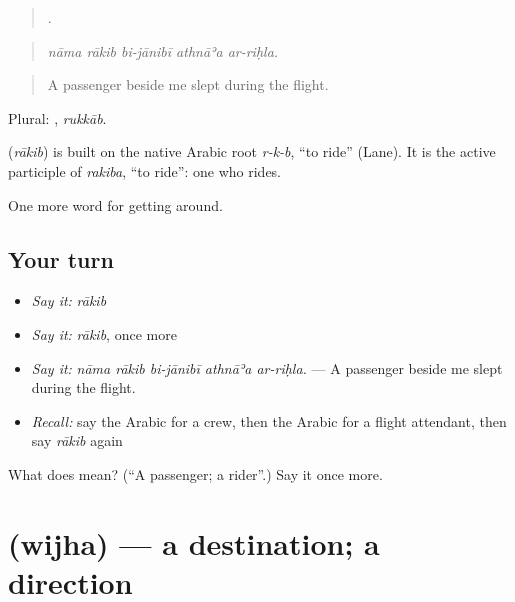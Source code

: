 \begin{quote}
    .
\end{quote}

\begin{quote}
\emph{nāma rākib bi-jānibī athnāʾa ar-riḥla.}
\end{quote}

\begin{quote}
A passenger beside me slept during the flight.
\end{quote}

Plural: , \emph{rukkāb}.

\begin{cousinweb}
\textbf{} (\emph{rākib}) is built on the native Arabic root \emph{r-k-b}, \textquotedblleft{}to ride\textquotedblright{} (Lane). It is the active participle of \emph{rakiba}, \textquotedblleft{}to ride\textquotedblright{}: one who rides.
\end{cousinweb}

\begin{grammarlens}[title={What you've built}]
One more word for getting around.
\end{grammarlens}

\subsection*{Your turn}
\begin{itemize}
\raggedright
  \item \emph{Say it:} \emph{rākib}
  \item \emph{Say it:} \emph{rākib}, once more
  \item \emph{Say it:} \emph{nāma rākib bi-jānibī athnāʾa ar-riḥla.} — A passenger beside me slept during the flight.
  \item \emph{Recall:} say the Arabic for a crew, then the Arabic for a flight attendant, then say \emph{rākib} again
\end{itemize}

\begin{tcolorbox}[breakable,colback=teal!4,colframe=teal!35!black,title={Before you move on}]
What does  mean? (\textquotedblleft{}A passenger; a rider\textquotedblright{}.) Say it once more.
\end{tcolorbox}
\section[\texorpdfstring{\ar{وجهة} (wijha)}{وجهة (wijha)}]{ (wijha) — a destination; a direction}


